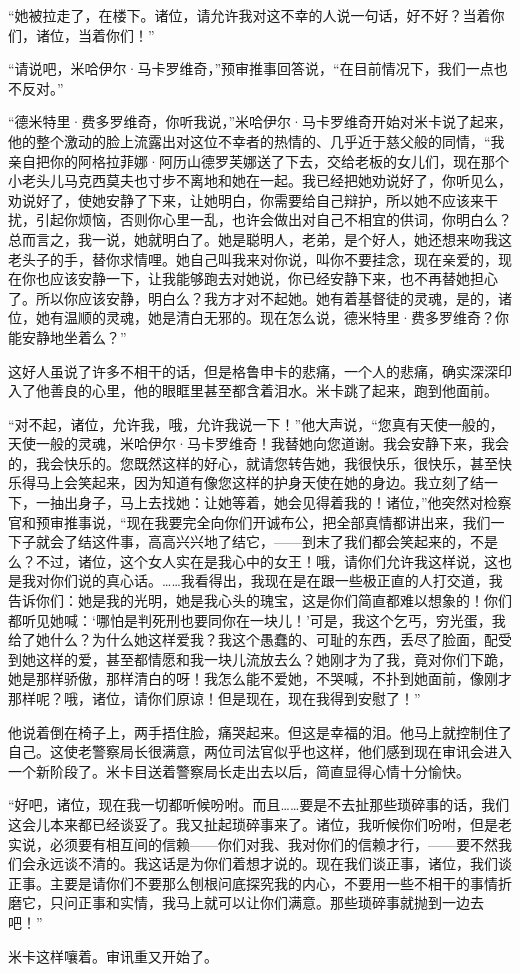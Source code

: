 \par “她被拉走了，在楼下。诸位，请允许我对这不幸的人说一句话，好不好？当着你们，诸位，当着你们！”
\par “请说吧，米哈伊尔·马卡罗维奇，”预审推事回答说，“在目前情况下，我们一点也不反对。”
\par “德米特里·费多罗维奇，你听我说，”米哈伊尔·马卡罗维奇开始对米卡说了起来，他的整个激动的脸上流露出对这位不幸者的热情的、几乎近于慈父般的同情，“我亲自把你的阿格拉菲娜·阿历山德罗芙娜送了下去，交给老板的女儿们，现在那个小老头儿马克西莫夫也寸步不离地和她在一起。我已经把她劝说好了，你听见么，劝说好了，使她安静了下来，让她明白，你需要给自己辩护，所以她不应该来干扰，引起你烦恼，否则你心里一乱，也许会做出对自己不相宜的供词，你明白么？总而言之，我一说，她就明白了。她是聪明人，老弟，是个好人，她还想来吻我这老头子的手，替你求情哩。她自己叫我来对你说，叫你不要挂念，现在亲爱的，现在你也应该安静一下，让我能够跑去对她说，你已经安静下来，也不再替她担心了。所以你应该安静，明白么？我方才对不起她。她有着基督徒的灵魂，是的，诸位，她有温顺的灵魂，她是清白无邪的。现在怎么说，德米特里·费多罗维奇？你能安静地坐着么？”
\par 这好人虽说了许多不相干的话，但是格鲁申卡的悲痛，一个人的悲痛，确实深深印入了他善良的心里，他的眼眶里甚至都含着泪水。米卡跳了起来，跑到他面前。
\par “对不起，诸位，允许我，哦，允许我说一下！”他大声说，“您真有天使一般的，天使一般的灵魂，米哈伊尔·马卡罗维奇！我替她向您道谢。我会安静下来，我会的，我会快乐的。您既然这样的好心，就请您转告她，我很快乐，很快乐，甚至快乐得马上会笑起来，因为知道有像您这样的护身天使在她的身边。我立刻了结一下，一抽出身子，马上去找她：让她等着，她会见得着我的！诸位，”他突然对检察官和预审推事说，“现在我要完全向你们开诚布公，把全部真情都讲出来，我们一下子就会了结这件事，高高兴兴地了结它，——到末了我们都会笑起来的，不是么？不过，诸位，这个女人实在是我心中的女王！哦，请你们允许我这样说，这也是我对你们说的真心话。……我看得出，我现在是在跟一些极正直的人打交道，我告诉你们：她是我的光明，她是我心头的瑰宝，这是你们简直都难以想象的！你们都听见她喊：‘哪怕是判死刑也要同你在一块儿！’可是，我这个乞丐，穷光蛋，我给了她什么？为什么她这样爱我？我这个愚蠢的、可耻的东西，丢尽了脸面，配受到她这样的爱，甚至都情愿和我一块儿流放去么？她刚才为了我，竟对你们下跪，她是那样骄傲，那样清白的呀！我怎么能不爱她，不哭喊，不扑到她面前，像刚才那样呢？哦，诸位，请你们原谅！但是现在，现在我得到安慰了！”
\par 他说着倒在椅子上，两手捂住脸，痛哭起来。但这是幸福的泪。他马上就控制住了自己。这使老警察局长很满意，两位司法官似乎也这样，他们感到现在审讯会进入一个新阶段了。米卡目送着警察局长走出去以后，简直显得心情十分愉快。
\par “好吧，诸位，现在我一切都听候吩咐。而且……要是不去扯那些琐碎事的话，我们这会儿本来都已经谈妥了。我又扯起琐碎事来了。诸位，我听候你们吩咐，但是老实说，必须要有相互间的信赖——你们对我、我对你们的信赖才行，——要不然我们会永远谈不清的。我这话是为你们着想才说的。现在我们谈正事，诸位，我们谈正事。主要是请你们不要那么刨根问底探究我的内心，不要用一些不相干的事情折磨它，只问正事和实情，我马上就可以让你们满意。那些琐碎事就抛到一边去吧！”
\par 米卡这样嚷着。审讯重又开始了。
